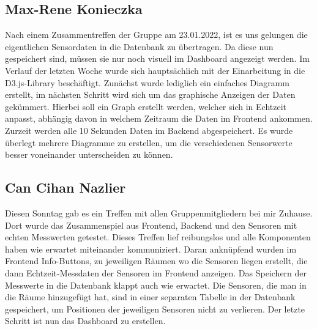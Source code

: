 \documentclass[]{article}
\begin{document}
\subsection{Max-Rene Konieczka}
Nach einem Zusammentreffen der Gruppe am 23.01.2022, ist es uns gelungen die eigentlichen Sensordaten in die Datenbank zu übertragen. Da diese nun gespeichert sind, müssen sie nur noch visuell im Dashboard angezeigt werden. Im Verlauf der letzten Woche wurde sich hauptsächlich mit der Einarbeitung in die D3.js-Library beschäftigt. Zunächst wurde lediglich ein einfaches Diagramm erstellt, im nächsten Schritt wird sich um das graphische Anzeigen der Daten gekümmert. Hierbei soll ein Graph erstellt werden, welcher sich in Echtzeit anpasst, abhängig davon in welchem Zeitraum die Daten im Frontend ankommen. Zurzeit werden alle 10 Sekunden Daten im Backend abgespeichert. Es wurde überlegt mehrere Diagramme zu erstellen, um die verschiedenen Sensorwerte besser voneinander unterscheiden zu können.  

\subsection{Can Cihan Nazlier}
Diesen Sonntag gab es ein Treffen mit allen Gruppenmitgliedern bei mir Zuhause. Dort wurde das Zusammenspiel aus Frontend, Backend und den Sensoren mit echten Messwerten getestet. Dieses Treffen lief reibungslos und alle Komponenten haben wie erwartet miteinander kommuniziert. Daran anknüpfend wurden im Frontend Info-Buttons, zu jeweiligen Räumen wo die Sensoren liegen erstellt, die dann Echtzeit-Messdaten der Sensoren im Frontend anzeigen. Das Speichern der Messwerte in die Datenbank klappt auch wie erwartet.
Die Sensoren, die man in die Räume hinzugefügt hat, sind in einer separaten Tabelle in der Datenbank gespeichert, um Positionen der jeweiligen Sensoren nicht zu verlieren.
Der letzte Schritt ist nun das Dashboard zu erstellen.

\printbibliography
\end{document}
